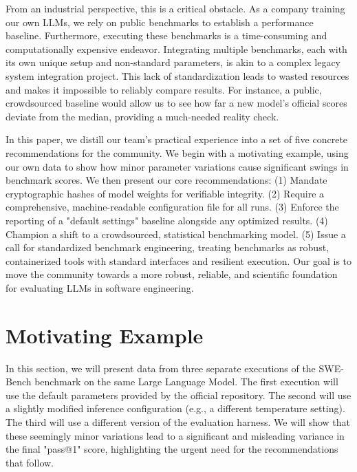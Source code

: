 \documentclass[sigconf,review]{acmart}
\begin{document}
From an industrial perspective, this is a critical obstacle. As a company training our own LLMs, we rely on public benchmarks to establish a performance baseline. Furthermore, executing these benchmarks is a time-consuming and computationally expensive endeavor. Integrating multiple benchmarks, each with its own unique setup and non-standard parameters, is akin to a complex legacy system integration project. This lack of standardization leads to wasted resources and makes it impossible to reliably compare results. For instance, a public, crowdsourced baseline would allow us to see how far a new model's official scores deviate from the median, providing a much-needed reality check.

In this paper, we distill our team's practical experience into a set of five concrete recommendations for the community. We begin with a motivating example, using our own data to show how minor parameter variations cause significant swings in benchmark scores. We then present our core recommendations: (1) Mandate cryptographic hashes of model weights for verifiable integrity. (2) Require a comprehensive, machine-readable configuration file for all runs. (3) Enforce the reporting of a "default settings" baseline alongside any optimized results. (4) Champion a shift to a crowdsourced, statistical benchmarking model. (5) Issue a call for standardized benchmark engineering, treating benchmarks as robust, containerized tools with standard interfaces and resilient execution. Our goal is to move the community towards a more robust, reliable, and scientific foundation for evaluating LLMs in software engineering.


\section{Motivating Example}
\label{sec:motivation}
In this section, we will present data from three separate executions of the SWE-Bench benchmark on the same Large Language Model. The first execution will use the default parameters provided by the official repository. The second will use a slightly modified inference configuration (e.g., a different temperature setting). The third will use a different version of the evaluation harness. We will show that these seemingly minor variations lead to a significant and misleading variance in the final "pass@1" score, highlighting the urgent need for the recommendations that follow.
\end{document}
